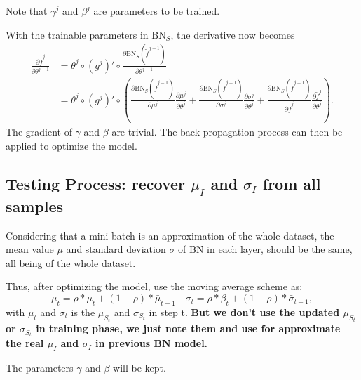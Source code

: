 Note that $\gamma^j$ and $\beta^j$ are parameters to be trained.

With the trainable parameters in $\text{BN}_S$, the derivative now becomes
\begin{align}
\frac{\partial \tilde f^j}{ \partial \theta^{j-1}} &= \theta^j \circ (g^j)' \circ \frac{\partial \text{BN}_{S} (\tilde f^{j-1})}{ \partial \theta^{j-1}} \\
&=  \theta^j \circ (g^j)' \circ \left(\frac{\partial \text{BN}_{S} (\tilde f^{j-1})}{ \partial \mu^j}\frac{\partial \mu^j}{\partial \theta^j} + \frac{\partial \text{BN}_{S} (\tilde f^{j-1})}{ \partial \sigma^j}\frac{\partial \sigma^j}{\partial \theta^j} + \frac{\partial \text{BN}_{S} (\tilde f^{j-1})}{ \partial \tilde f^j}\frac{\partial \tilde f^j}{\partial \theta^j}  \right).
\end{align}
The gradient of $\gamma$ and $\beta$ are trivial. The back-propagation process can then be applied to optimize the model.

\subsection{Testing Process: recover $\mu_I$ and $\sigma_I$ from all samples}
Considering that a mini-batch is an approximation of the whole dataset, the mean value $\mu$ and standard deviation $\sigma$ of BN in each layer, should be the same, all being of the whole dataset.


Thus, after optimizing the model,  use the moving average scheme as:
\begin{equation}\label{BN-timeaverage}
\mu_t=\rho*\mu_t+(1-\rho)*\bar\mu_{t-1} \quad \sigma_t=\rho*\beta_t+(1-\rho)*\bar\sigma_{t-1},
\end{equation}
with $\mu_t$ and $\sigma_t$ is the $\mu_{S_t}$ and $\sigma_{S_t}$ in step t. {\bf But we don't use the updated $\mu_{S_t}$ or $\sigma_{S_t}$ in training phase, we just note them and use for approximate the real $\mu_I$ and $\sigma_I$ in previous BN model.} 

The parameters $\gamma$ and $\beta$ will be kept.

